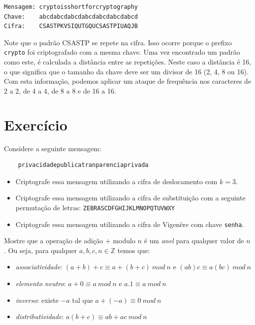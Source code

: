 \begin{example}
\begin{verbatim}
Mensagem: cryptoisshortforcryptography
Chave:    abcdabcdabcdabcdabcdabcdabcd
Cifra:    CSASTPKVSIQUTGQUCSASTPIUAQJB
\end{verbatim}
\end{example}

Note que o padrão CSASTP se repete na cifra.
Isso ocorre porque o prefixo {\tt crypto} foi criptografado com a mesma chave.
Uma vez encontrado um padrão como este, é calculada a distância entre as repetições.
Neste caso a distância é 16, o que significa que o tamanho da chave deve ser um divisor de 16 (2, 4, 8 ou 16).
Com esta informação, podemos aplicar um ataque de frequência nos caracteres de 2 a 2, de 4 a 4, de 8 a 8 e de 16 a 16.



\section{Exercício}
\label{sec:exercicio}

\begin{exercicio}
  Considere a seguinte mensagem:
  \begin{verbatim}
    privacidadepublicatranparenciaprivada
  \end{verbatim}
  \begin{itemize}
  \item Criptografe essa mensagem utilizando a cifra de deslocamento com $k = 3$.
  \item Criptografe essa mensagem utilizando a cifra de substituição com a seguinte permutação de letras: {\tt ZEBRASCDFGHIJKLMNOPQTUVWXY}
  \item Criptografe essa mensagem utilizando a cifra de Vigenère com chave {\tt senha}.
  \end{itemize}
\end{exercicio}


\begin{exercicio}
  Mostre que a operação de adição $+$ modulo $n$ é um {\em anel} para qualquer valor de $n$.
Ou seja, para qualquer $a, b, c, n \in \mathbb{Z}$ temos que:
\begin{itemize}
\item {\em associatividade}: $(a+b)+c \equiv a+(b+c)\ mod\ n$ e $(ab)c \equiv a(bc)\ mod\ n$
\item {\em elemento neutro}: $a + 0 \equiv a\ mod\ n$ e $a.1 \equiv a\ mod\ n$
\item {\em inverso}: existe $-a$ tal que $a + (-a) \equiv 0\ mod\ n$
\item {\em distributividade}: $a(b + c) \equiv ab + ac\ mod\ n$
\end{itemize}
\end{exercicio}

